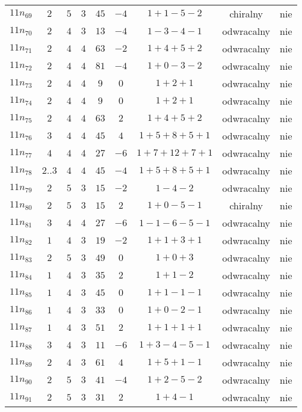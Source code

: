 \begin{longtable}{ccccccccc}
$11n_{69}$ & $2$ & $5$ & $3$ & $45$ & $-4$ & $1+1-5-2$ & chiralny & nie \\
$11n_{70}$ & $2$ & $4$ & $3$ & $13$ & $-4$ & $1-3-4-1$ & odwracalny & nie \\
$11n_{71}$ & $2$ & $4$ & $4$ & $63$ & $-2$ & $1+4+5+2$ & odwracalny & nie \\
$11n_{72}$ & $2$ & $4$ & $4$ & $81$ & $-4$ & $1+0-3-2$ & odwracalny & nie \\
$11n_{73}$ & $2$ & $4$ & $4$ & $9$ & $0$ & $1+2+1$ & odwracalny & nie \\
$11n_{74}$ & $2$ & $4$ & $4$ & $9$ & $0$ & $1+2+1$ & odwracalny & nie \\
$11n_{75}$ & $2$ & $4$ & $4$ & $63$ & $2$ & $1+4+5+2$ & odwracalny & nie \\
$11n_{76}$ & $3$ & $4$ & $4$ & $45$ & $4$ & $1+5+8+5+1$ & odwracalny & nie \\
$11n_{77}$ & $4$ & $4$ & $4$ & $27$ & $-6$ & $1+7+12+7+1$ & odwracalny & nie \\
$11n_{78}$ & $2..3$ & $4$ & $4$ & $45$ & $-4$ & $1+5+8+5+1$ & odwracalny & nie \\
$11n_{79}$ & $2$ & $5$ & $3$ & $15$ & $-2$ & $1-4-2$ & odwracalny & nie \\
$11n_{80}$ & $2$ & $5$ & $3$ & $15$ & $2$ & $1+0-5-1$ & chiralny & nie \\
$11n_{81}$ & $3$ & $4$ & $4$ & $27$ & $-6$ & $1-1-6-5-1$ & odwracalny & nie \\
$11n_{82}$ & $1$ & $4$ & $3$ & $19$ & $-2$ & $1+1+3+1$ & odwracalny & nie \\
$11n_{83}$ & $2$ & $5$ & $3$ & $49$ & $0$ & $1+0+3$ & odwracalny & nie \\
$11n_{84}$ & $1$ & $4$ & $3$ & $35$ & $2$ & $1+1-2$ & odwracalny & nie \\
$11n_{85}$ & $1$ & $4$ & $3$ & $45$ & $0$ & $1+1-1-1$ & odwracalny & nie \\
$11n_{86}$ & $1$ & $4$ & $3$ & $33$ & $0$ & $1+0-2-1$ & odwracalny & nie \\
$11n_{87}$ & $1$ & $4$ & $3$ & $51$ & $2$ & $1+1+1+1$ & odwracalny & nie \\
$11n_{88}$ & $3$ & $4$ & $3$ & $11$ & $-6$ & $1+3-4-5-1$ & odwracalny & nie \\
$11n_{89}$ & $2$ & $4$ & $3$ & $61$ & $4$ & $1+5+1-1$ & odwracalny & nie \\
$11n_{90}$ & $2$ & $5$ & $3$ & $41$ & $-4$ & $1+2-5-2$ & odwracalny & nie \\
$11n_{91}$ & $2$ & $5$ & $3$ & $31$ & $2$ & $1+4-1$ & odwracalny & nie \\

\end{longtable}

